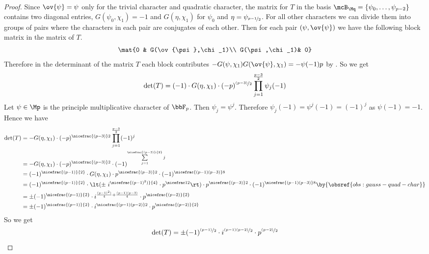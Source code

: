 \begin{proof}
  Since $\ov{\psi}=\psi$ only for the trivial character and quadratic character, the matrix for $T$ in the basis $\mcB_{\Mq}=\{\psi_0,\dots, \psi_{p-2}\}$ contains two diagonal entries, $G(\psi_0,\chi_1)=-1$ and $G(\eta,\chi_1)$ for $\psi_0$ and $\eta=\psi_{\nicefrac{p-1}2}$. For all other characters we can divide them into groups of pairs where the characters in each pair are conjugates of each other. Then for each pair $(\psi,\ov{\psi})$ we have the following block matrix in the matrix of $T$. $$\mat{0 & G(\ov{\psi},\chi_1)\\ G(\psi,\chi_1)& 0}$$Therefore in the determinant of the matrix $T$ each block contributes $-G(\psi,\chi_1)G(\ov{\psi},\chi_1)=-\psi(-1)p$ by . So we get $$\det(T)=(-1)\cdot G(\eta,\chi_1) \cdot (-p)^{\nicefrac{(p-3)}2}\prod_{j=1}^{\frac{p-3}2}\psi_j(-1)$$Let $\psi\in\Mp$ is the principle multiplicative character of $\bbF_p$. Then $\psi_j=\psi^j$. Therefore $\psi_j(-1)=\psi^j(-1)=(-1)^j$ as $\psi(-1)=-1$. Hence we have \begin{align*}
    \det(T) & = - G(\eta,\chi_1) \cdot (-p)^{\nicefrac{(p-3)}2}\prod_{j=1}^{\frac{p-3}2}(-1)^j\\ 
    & = - G(\eta,\chi_1) \cdot (-p)^{\nicefrac{(p-3)}2}\cdot (-1)^{\sum\limits_{j=1}^{\nicefrac{(p-3)}{2}}j}\\ 
    & =  (-1)^{\nicefrac{(p-1)}{2}}\cdot G(\eta,\chi_1) \cdot p^{\nicefrac{(p-3)}2}\cdot (-1)^{\nicefrac{(p-1)(p-3)}8}\\ 
    & = (-1)^{\nicefrac{(p-1)}{2}}\cdot \lt(\pm\ i^{\nicefrac{(p-1)^2)}{4}}\cdot p^{\nicefrac12}\rt) \cdot p^{\nicefrac{(p-3)}2}\cdot (-1)^{\nicefrac{(p-1)(p-3)}8}\by{\obsref{obs:gauss-quad-char}}\\ 
    & = \pm (-1)^{\nicefrac{(p-1)}{2}}\cdot i^{\frac{(p-1)^2)}{4}+\frac{(p-1)(p-3)}4}\cdot p^{\nicefrac{(p-2)}{2}}\\ 
    & = \pm (-1)^{\nicefrac{(p-1)}{2}}\cdot i^{\nicefrac{(p-1)(p-2)}2}\cdot p^{\nicefrac{(p-2)}{2}}
  \end{align*}
  So we get \begin{equation}\label{eq:fourier-basis-det}
    \det(T)=\pm (-1)^{\nicefrac{(p-1)}{2}}\cdot i^{\nicefrac{(p-1)(p-2)}2}\cdot p^{\nicefrac{(p-2)}{2}}
  \end{equation}


\end{proof}
